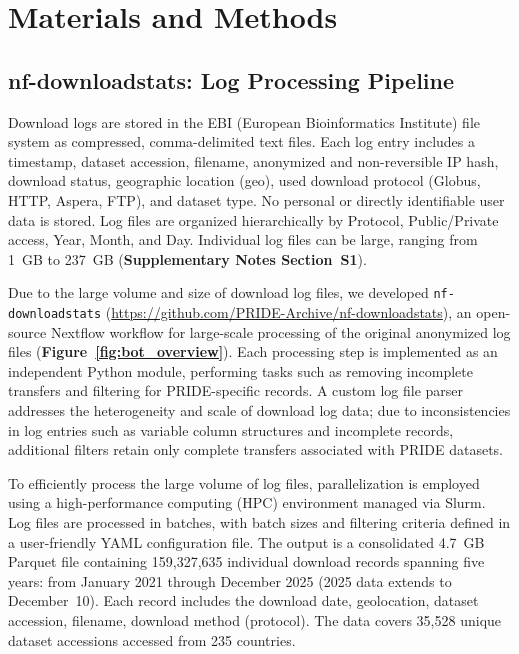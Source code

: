 \documentclass[11pt,a4paper]{article}
\begin{document}
\section{Materials and Methods}

\subsection{nf-downloadstats: Log Processing Pipeline}

Download logs are stored in the EBI (European Bioinformatics Institute) file system as compressed, comma-delimited text files. Each log entry includes a timestamp, dataset accession, filename, anonymized and non-reversible IP hash, download status, geographic location (geo), used download protocol (Globus, HTTP, Aspera, FTP), and dataset type. No personal or directly identifiable user data is stored. Log files are organized hierarchically by Protocol, Public/Private access, Year, Month, and Day. Individual log files can be large, ranging from 1~GB to 237~GB (\textbf{Supplementary Notes Section~S1}).

\begin{sloppypar}
Due to the large volume and size of download log files, we developed \texttt{nf-downloadstats} (\url{https://github.com/PRIDE-Archive/nf-downloadstats}), an open-source Nextflow workflow for large-scale processing of the original anonymized log files (\textbf{Figure~\ref{fig:bot_overview}}). Each processing step is implemented as an independent Python module, performing tasks such as removing incomplete transfers and filtering for PRIDE-specific records. A custom log file parser addresses the heterogeneity and scale of download log data; due to inconsistencies in log entries such as variable column structures and incomplete records, additional filters retain only complete transfers associated with PRIDE datasets.
\end{sloppypar}

To efficiently process the large volume of log files, parallelization is employed using a high-performance computing (HPC) environment managed via Slurm. Log files are processed in batches, with batch sizes and filtering criteria defined in a user-friendly YAML configuration file. The output is a consolidated 4.7~GB Parquet file containing 159,327,635 individual download records spanning five years: from January 2021 through December 2025 (2025 data extends to December~10). Each record includes the download date, geolocation, dataset accession, filename, download method (protocol). The data covers 35,528 unique dataset accessions accessed from 235 countries.
\end{document}
